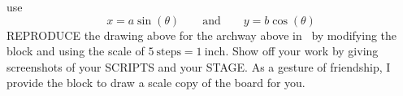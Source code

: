 \documentclass[noauthor,nooutcomes,hints]{ximera}
\begin{document}
\begin{question}
\begin{enumerate}
\begin{center}
      \end{center}
    use
    \[
    x = a\sin(\theta) \qquad\text{and} \qquad y= b\cos(\theta)
    \]
    REPRODUCE the drawing above for the archway above in \snap\ by
    modifying the block
     and using
    the scale of $5~\text{steps} = 1~\text{inch}$.  Show off your work
    by giving screenshots of your SCRIPTS and your STAGE.  As a
    gesture of friendship, I provide the block
     to draw a scale copy of the board for
    you.
 

\end{enumerate}
\end{question}
\end{document}
